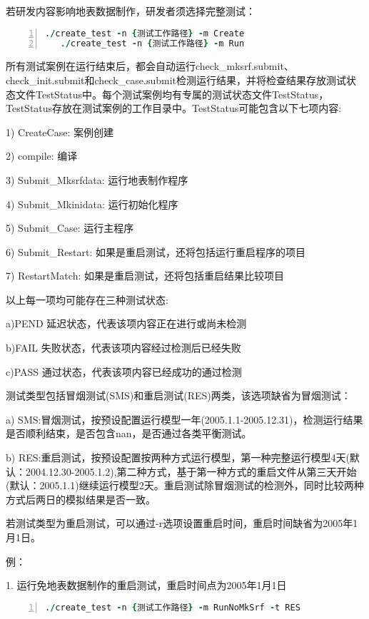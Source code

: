 若研发内容影响地表数据制作，研发者须选择完整测试：

\begin{lstlisting}[language=fortran, basicstyle=\linespread{1.0}\footnotesize\ttfamily, commentstyle=\color{black}, numbers=left, numberstyle=\tiny, xleftmargin=1.5em,xrightmargin=0em, aboveskip=1em]
   ./create_test -n {测试工作路径} -m Create
   ./create_test -n {测试工作路径} -m Run
\end{lstlisting}

所有测试案例在运行结束后，都会自动运行check\_mksrf.submit、check\_init.submit和check\_case.submit检测运行结果，并将检查结果存放测试状态文件TestStatus中。每个测试案例均有专属的测试状态文件TestStatus，TestStatus存放在测试案例的工作目录中。TestStatus可能包含以下七项内容:

1) CreateCase: 案例创建

2) compile: 编译

3) Submit\_Mksrfdata: 运行地表制作程序

4) Submit\_Mkinidata: 运行初始化程序

5) Submit\_Case: 运行主程序

6) Submit\_Restart: 如果是重启测试，还将包括运行重启程序的项目

7) RestartMatch: 如果是重启测试，还将包括重启结果比较项目

以上每一项均可能存在三种测试状态:

a)PEND 延迟状态，代表该项内容正在进行或尚未检测

b)FAIL 失败状态，代表该项内容经过检测后已经失败

c)PASS 通过状态，代表该项内容已经成功的通过检测

{测试类型}包括冒烟测试(SMS)和重启测试(RES)两类，该选项缺省为冒烟测试：

a) SMS:冒烟测试，按预设配置运行模型一年(2005.1.1-2005.12.31)，检测运行结果是否顺利结束，是否包含nan，是否通过各类平衡测试。

b) RES:重启测试，按预设配置按两种方式运行模型，第一种完整运行模型4天(默认：2004.12.30-2005.1.2),第二种方式，基于第一种方式的重启文件从第三天开始(默认：2005.1.1)继续运行模型2天。重启测试除冒烟测试的检测外，同时比较两种方式后两日的模拟结果是否一致。

若测试类型为重启测试，可以通过-r选项设置重启时间，重启时间缺省为2005年1月1日。

例：

1. 运行免地表数据制作的重启测试，重启时间点为2005年1月1日
\begin{lstlisting}[language=fortran, basicstyle=\linespread{1.0}\footnotesize\ttfamily, commentstyle=\color{black}, numbers=left, numberstyle=\tiny, xleftmargin=1.5em,xrightmargin=0em, aboveskip=1em]
   ./create_test -n {测试工作路径} -m RunNoMkSrf -t RES
\end{lstlisting}

